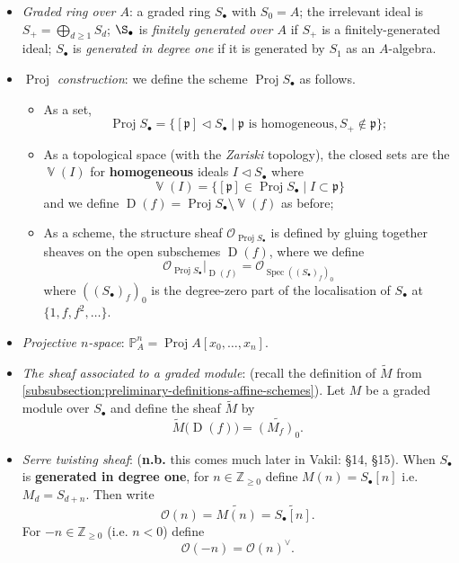 \documentclass[10pt]{article}
\DeclareMathOperator{\Spec}{Spec}
\DeclareMathOperator{\Proj}{Proj}
\DeclareMathOperator{\V}{\mathbb{V}}
\DeclareMathOperator{\D}{D}
\renewcommand{\O}{\mathcal{O}}
\newcommand{\Z}{\mathbb{Z}}
\newcommand{\prid}{\mathfrak{p}}
\renewcommand{\P}{\mathbb{P}}
\newcommand{\ideal}{\triangleleft}
\begin{document}
                \begin{itemize}
                    \item \textit{Graded ring over $A$}: a graded ring $S_\bullet$ with $S_0=A$; the irrelevant ideal is $S_+=\bigoplus_{d\geqslant1}S_d$; $\S_\bullet$ is \textit{finitely generated over $A$} if $S_+$ is a finitely-generated ideal; $S_\bullet$ is \textit{generated in degree one} if it is generated by $S_1$ as an $A$-algebra.
                    \item \textit{$\Proj$ construction}: we define the scheme $\Proj S_\bullet$ as follows.
                        \begin{itemize}
                            \item As a set, \[\Proj S_\bullet = \big\{[\prid]\ideal S_\bullet \mid \prid\text{ is homogeneous}, S_+\not\in\prid\big\};\]
                            \item As a topological space (with the \textit{Zariski} topology), the closed sets are the $\V(I)$ for \textbf{homogeneous} ideals $I\ideal S_\bullet$ where \[\V(I) = \{[\prid]\in\Proj S_\bullet \mid I\subset\prid\}\]
                                and we define $\D(f)=\Proj S_\bullet\setminus\V(f)$ as before;
                            \item As a scheme, the structure sheaf $\O_{\Proj S_\bullet}$ is defined by gluing together sheaves on the open subschemes $\D(f)$, where we define \[\O_{\Proj S_\bullet}|_{\D(f)} = \O_{\Spec((S_\bullet)_f)_0}\]
                                where $((S_\bullet)_f)_0$ is the degree-zero part of the localisation of $S_\bullet$ at $\{1,f,f^2,\ldots\}$.
                        \end{itemize}
                    \item \textit{Projective $n$-space}: $\P_A^n=\Proj A[x_0,\ldots,x_n]$.
                    \item \textit{The sheaf associated to a graded module}: (recall the definition of $\widetilde{M}$ from \cref{subsubsection:preliminary-definitions-affine-schemes}). Let $M$ be a graded module over $S_\bullet$ and define the sheaf $\widetilde{M}$ by \[\widetilde{M}\big(\D(f)\big) = \widetilde{(M_f)_0}.\]
                    \item \textit{Serre twisting sheaf}: (\textbf{n.b.} this comes much later in Vakil: §14, §15). When $S_\bullet$ is \textbf{generated in degree one}, for $n\in\Z_{\geqslant0}$ define $M(n)=S_\bullet[n]$ i.e. $M_d=S_{d+n}$. Then write \[\O(n) = \widetilde{M(n)} = \widetilde{S_\bullet[n]}.\]
                        For $-n\in\Z_{\geqslant0}$ (i.e. $n<0$) define \[\O(-n) = \O(n)^\vee.\]
                \end{itemize}
                
\end{document}
